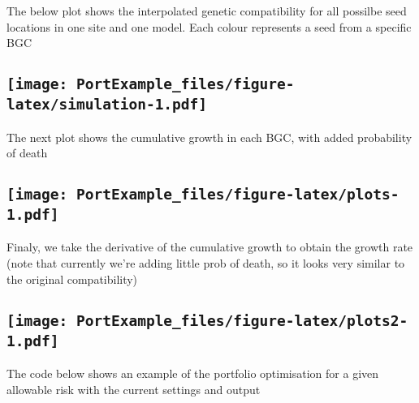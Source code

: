\documentclass[]{article}
\begin{document}
The below plot shows the interpolated genetic compatibility for all
possilbe seed locations in one site and one model. Each colour
represents a seed from a specific BGC

\subsection[]{\texorpdfstring{\protect\texttt{[image: PortExample\_files/figure-latex/simulation-1.pdf]}}{}}\label{section}

The next plot shows the cumulative growth in each BGC, with added
probability of death

\subsection[]{\texorpdfstring{\protect\texttt{[image: PortExample\_files/figure-latex/plots-1.pdf]}}{}}\label{section-1}

Finaly, we take the derivative of the cumulative growth to obtain the
growth rate (note that currently we're adding little prob of death, so
it looks very similar to the original compatibility)

\subsection[]{\texorpdfstring{\protect\texttt{[image: PortExample\_files/figure-latex/plots2-1.pdf]}}{}}\label{section-2}

The code below shows an example of the portfolio optimisation for a
given allowable risk with the current settings and output
\end{document}
